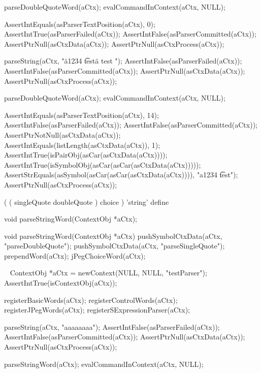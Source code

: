  parseDoubleQuoteWord(aCtx);
  evalCommandInContext(aCtx, NULL);
  
  AssertIntEquals(asParserTextPosition(aCtx), 0);
  AssertIntTrue(asParserFailed(aCtx));
  AssertIntFalse(asParserCommitted(aCtx));
  AssertPtrNull(asCtxData(aCtx));
  AssertPtrNull(asCtxProcess(aCtx));
\stopCTest
\stopTestCase

\startCTest
  parseString(aCtx, "\"a1234 \t test\" a test ");
  AssertIntFalse(asParserFailed(aCtx));
  AssertIntFalse(asParserCommitted(aCtx));
  AssertPtrNull(asCtxData(aCtx));
  AssertPtrNull(asCtxProcess(aCtx));
  
  parseDoubleQuoteWord(aCtx);
  evalCommandInContext(aCtx, NULL);
  
  AssertIntEquals(asParserTextPosition(aCtx), 14);
  AssertIntFalse(asParserFailed(aCtx));
  AssertIntFalse(asParserCommitted(aCtx));
  AssertPtrNotNull(asCtxData(aCtx));
  AssertIntEquals(listLength(asCtxData(aCtx)), 1);
  AssertIntTrue(isPairObj(asCar(asCtxData(aCtx))));
  AssertIntTrue(isSymbolObj(asCar(asCar(asCtxData(aCtx)))));
  AssertStrEquals(asSymbol(asCar(asCar(asCtxData(aCtx)))), "a1234 \t test");
  AssertPtrNull(asCtxProcess(aCtx));
\stopCTest
\stopTestCase
\stopTestSuite

\startTestSuite[parseStringWord]

\starttyping
(
  ( singleQuote doubleQuote ) choice
) 'string' define
\stoptyping

\startCHeader
void parseStringWord(ContextObj *aCtx);
\stopCHeader

\startCCode
void parseStringWord(ContextObj *aCtx) {
  pushSymbolCtxData(aCtx, "parseDoubleQuote");
  pushSymbolCtxData(aCtx, "parseSingleQuote");
  prependWord(aCtx);
  jPegChoiceWord(aCtx);
}
\stopCCode

\CTestsSuiteSetup\
\startCTest
  ContextObj *aCtx = newContext(NULL, NULL, "testParser");
  AssertIntTrue(isContextObj(aCtx));
  
  registerBasicWords(aCtx);
  registerControlWords(aCtx);
  registerJPegWords(aCtx);
  registerSExpressionParser(aCtx);
\stopCTest

\startCTest
  parseString(aCtx, "aaaaaaaa");
  AssertIntFalse(asParserFailed(aCtx));
  AssertIntFalse(asParserCommitted(aCtx));
  AssertPtrNull(asCtxData(aCtx));
  AssertPtrNull(asCtxProcess(aCtx));
  
  parseStringWord(aCtx);
  evalCommandInContext(aCtx, NULL);
  
